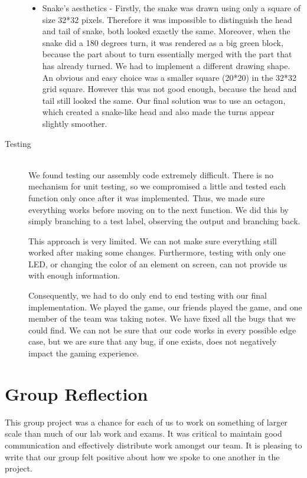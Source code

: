 \documentclass[9pt]{article}
\begin{document}
\begin{description}
\begin{itemize}
    \item Snake's aesthetics - Firstly, the snake was drawn using only a square of size 32*32 pixels. Therefore it was impossible to distinguish the head and tail of snake, both looked exactly the same. Moreover, when the snake did a 180 degrees turn, it was rendered as a big green block, because the part about to turn essentially merged with the part that has already turned. We had to implement a different drawing shape. An obvious and easy choice was a smaller square (20*20) in the 32*32 grid square. However this was not good enough, because the head and tail still looked the same. Our final solution was to use an octagon, which created a snake-like head and also made the turns appear slightly smoother.
    
    \end{itemize}    

    \item[Testing] \hfill \\
    We found testing our assembly code extremely difficult. There is no mechanism for unit testing, so we compromised a little and tested each function only once after it was implemented. Thus, we made sure everything works before moving on to the next function. We did this by simply branching to a test label, observing the output and branching back.
    
    This approach is very limited. We can not make sure everything still worked after making some changes. Furthermore, testing with only one LED, or changing the color of an element on screen, can not provide us with enough information.
    
    Consequently, we had to do only end to end testing with our final implementation. We played the game, our friends played the game, and one member of the team was taking notes. We have fixed all the bugs that we could find. We can not be sure that our code works in every possible edge case, but we are sure that any bug, if one exists, does not negatively impact the gaming experience.  


\end{description}

\section*{Group Reflection}
This group project was a chance for each of us to work on something of larger scale than much of our lab work and exams. It was critical to maintain good communication and effectively distribute work amongst our team. It is pleasing to write that our group felt positive about how we spoke to one another in the project.
\end{document}

